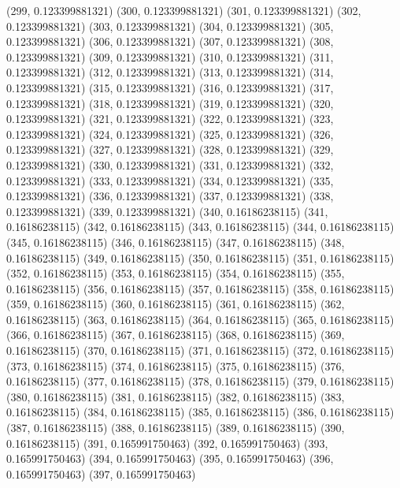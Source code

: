 {					(299, 0.123399881321)
					(300, 0.123399881321)
					(301, 0.123399881321)
					(302, 0.123399881321)
					(303, 0.123399881321)
					(304, 0.123399881321)
					(305, 0.123399881321)
					(306, 0.123399881321)
					(307, 0.123399881321)
					(308, 0.123399881321)
					(309, 0.123399881321)
					(310, 0.123399881321)
					(311, 0.123399881321)
					(312, 0.123399881321)
					(313, 0.123399881321)
					(314, 0.123399881321)
					(315, 0.123399881321)
					(316, 0.123399881321)
					(317, 0.123399881321)
					(318, 0.123399881321)
					(319, 0.123399881321)
					(320, 0.123399881321)
					(321, 0.123399881321)
					(322, 0.123399881321)
					(323, 0.123399881321)
					(324, 0.123399881321)
					(325, 0.123399881321)
					(326, 0.123399881321)
					(327, 0.123399881321)
					(328, 0.123399881321)
					(329, 0.123399881321)
					(330, 0.123399881321)
					(331, 0.123399881321)
					(332, 0.123399881321)
					(333, 0.123399881321)
					(334, 0.123399881321)
					(335, 0.123399881321)
					(336, 0.123399881321)
					(337, 0.123399881321)
					(338, 0.123399881321)
					(339, 0.123399881321)
					(340, 0.16186238115)
					(341, 0.16186238115)
					(342, 0.16186238115)
					(343, 0.16186238115)
					(344, 0.16186238115)
					(345, 0.16186238115)
					(346, 0.16186238115)
					(347, 0.16186238115)
					(348, 0.16186238115)
					(349, 0.16186238115)
					(350, 0.16186238115)
					(351, 0.16186238115)
					(352, 0.16186238115)
					(353, 0.16186238115)
					(354, 0.16186238115)
					(355, 0.16186238115)
					(356, 0.16186238115)
					(357, 0.16186238115)
					(358, 0.16186238115)
					(359, 0.16186238115)
					(360, 0.16186238115)
					(361, 0.16186238115)
					(362, 0.16186238115)
					(363, 0.16186238115)
					(364, 0.16186238115)
					(365, 0.16186238115)
					(366, 0.16186238115)
					(367, 0.16186238115)
					(368, 0.16186238115)
					(369, 0.16186238115)
					(370, 0.16186238115)
					(371, 0.16186238115)
					(372, 0.16186238115)
					(373, 0.16186238115)
					(374, 0.16186238115)
					(375, 0.16186238115)
					(376, 0.16186238115)
					(377, 0.16186238115)
					(378, 0.16186238115)
					(379, 0.16186238115)
					(380, 0.16186238115)
					(381, 0.16186238115)
					(382, 0.16186238115)
					(383, 0.16186238115)
					(384, 0.16186238115)
					(385, 0.16186238115)
					(386, 0.16186238115)
					(387, 0.16186238115)
					(388, 0.16186238115)
					(389, 0.16186238115)
					(390, 0.16186238115)
					(391, 0.165991750463)
					(392, 0.165991750463)
					(393, 0.165991750463)
					(394, 0.165991750463)
					(395, 0.165991750463)
					(396, 0.165991750463)
					(397, 0.165991750463)
}
